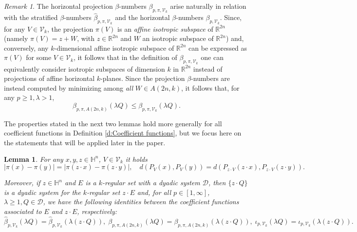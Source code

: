 \documentclass[12pt]{amsart}
\newcommand{\R}{\mathbb R}
\renewcommand{\H}{\mathbb H}
\numberwithin{equation}{section}
\theoremstyle{plain}
\newtheorem{lemma}[theorem]{Lemma}
\theoremstyle{definition}
\theoremstyle{remark}
\newtheorem{remark}[theorem]{Remark}
\begin{document}
\begin{remark}\label{r:AffVsFullProjBeta}
The horizontal projection $\beta$-numbers $\beta_{p,\pi,\mathcal V_k}$ arise naturally in relation with the stratified $\beta$-numbers $\widehat\beta_{p,\pi,\mathcal V_k}$ and the horizontal $\beta$-numbers $\beta_{p,\mathcal V_k}$. %
Since, for any $V\in \mathcal V_k$, the projection $\pi(V)$ is an \textit{affine isotropic subspace} of $\R^{2n}$ (namely $\pi(V)=z+W$, with $z\in \R^{2n}$ and $W$ an isotropic subspace of $\R^{2n}$) and, conversely, any  $k$-dimensional affine isotropic subspace of $\R^{2n}$ can be expressed as $\pi(V)$ for some $V\in\mathcal V_k$, it follows that in the definition of $\beta_{p,\pi,\mathcal V_k}$ one can equivalently consider isotropic subspaces of dimension $k$ in $\R^{2n}$ instead of projections of affine horizontal $k$-planes. Since the projection $\beta$-numbers are instead computed by minimizing among \textit{all} $W\in A(2n,k)$, it follows that, for any $p\geq 1, \lambda>1$,
\[\beta_{p,\pi,A(2n,k)}(\lambda Q)\leq \beta_{p,\pi,\mathcal V_k}(\lambda Q).\] 
\end{remark}

The properties stated in the next two lemmas hold more generally for all coefficient functions in Definition \ref{d:Coefficient functions}, but we focus here on the statements that will be applied later in the paper.


\begin{lemma}\label{lem_translations}
 For any $x,y, z\in\H^n$, $V\in \mathcal V_k$ it holds \[|\pi(x)-\pi(y)|=|\pi(z\cdot x)-\pi(z\cdot y)|,\quad d(P_V(x),P_V(y))=d(P_{z\cdot V}(z\cdot x),P_{z\cdot V}(z\cdot y)).\] 
 
 Moreover, if $z\in \mathbb{H}^n$ and $E$ is a $k$-regular set with a dyadic system $\mathcal{D}$, then $\{z\cdot Q\}$ is a dyadic system for the $k$-regular set $z\cdot E$ and, for all $p\in [1,\infty]$, $\lambda\geq 1, Q\in \mathcal{D}$, we have the following identities between the coefficient functions associated to $E$ and $z\cdot E$, respectively:
  \[\widehat\beta_{p,\mathcal{V}_k}(\lambda Q)=\widehat \beta_{p,\mathcal{V}_k}(\lambda (z\cdot Q)), \; \beta_{p,\pi,A(2n,k)}(\lambda Q)=\beta_{p,\pi,A(2n,k)}(\lambda (z\cdot Q)), \;\iota_{p,\mathcal V_k}(\lambda Q)=\iota_{p,\mathcal V_k}(\lambda(z\cdot Q)).\]
\end{lemma}
\end{document}
